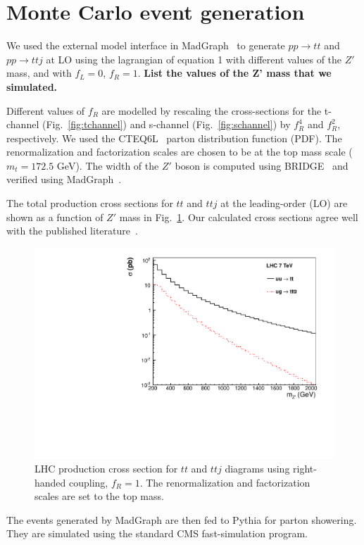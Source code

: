 \section{Monte Carlo event generation}
\label{sec:mc}


We used the external model interface in MadGraph~\cite{madgraph} 
to generate $pp \to tt$ and $pp \to ttj$ at LO 
using the lagrangian of equation 1 with
different values of 
the $Z'$ mass, and with $f_L = 0$, $f_R = 1$.  
{\bf List the values of the Z' mass that we simulated.}

Different
values of $f_R$ are modelled by rescaling the cross-sections
for the t-channel (Fig.~\ref{fig:tchannel}) and 
s-channel (Fig.~\ref{fig:schannel}) by $f_R^4$ and $f_R^2$,
respectively.  We used the 
CTEQ6L~\cite{cteq6l} parton distribution function (PDF). 
The renormalization and factorization scales are chosen 
to be at the top mass scale ($m_{t} = 172.5$ GeV). 
The width of the $Z'$ boson is computed using 
BRIDGE~\cite{bridge} and verified using MadGraph~\cite{madgraph}. 

The total production cross sections for $tt$ and $ttj$ 
at the leading-order (LO) are shown as a function of $Z'$ 
mass in 
Fig.~\ref{fig:sstopcross}. 
Our calculated cross sections agree well with the 
published literature~\cite{berger}. 

\begin{figure}[htb]
\begin{center}
\includegraphics[width=0.7\linewidth]{figs/sstopcross.pdf}
\caption{ LHC production cross section for $tt$ and $ttj$ diagrams using right-handed coupling, $f_R = 1$. 
The renormalization and factorization scales are set to the top mass. \label{fig:sstopcross}}
\end{center}
\end{figure}

The events generated by MadGraph are then fed to Pythia for 
parton showering.  They are simulated using the standard CMS
fast-simulation program.



